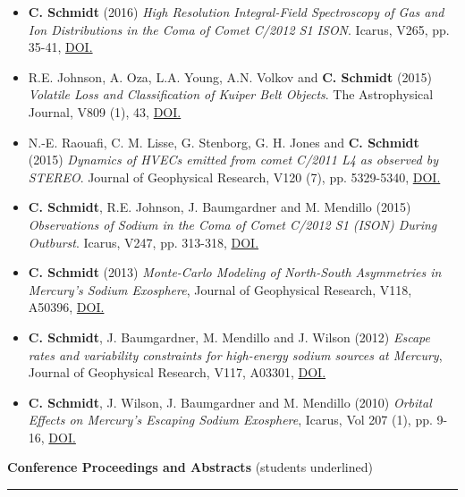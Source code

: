 \documentclass[12pt]{report}
\begin{document}
\begin{itemize}
  \item \textbf{C. Schmidt} (2016) \textit{High Resolution Integral-Field Spectroscopy of Gas and Ion Distributions in the Coma of Comet C/2012 S1 ISON}. Icarus, V265, pp. 35-41, \href{https://doi.org/10.1016/j.icarus.2015.10.009}{DOI.}
  \item R.E. Johnson, A. Oza, L.A. Young, A.N. Volkov and \textbf{C. Schmidt} (2015) \textit{Volatile Loss and Classification of Kuiper Belt Objects}. The Astrophysical Journal, V809 (1), 43, \href{https://doi.org/10.1088/0004-637X/809/1/43}{DOI.}
  \item N.-E. Raouafi, C. M. Lisse, G. Stenborg, G. H. Jones and \textbf{C. Schmidt} (2015) \textit{Dynamics of HVECs emitted from comet C/2011 L4 as observed by STEREO}. Journal of Geophysical Research, V120 (7), pp. 5329-5340, \href{https://doi.org/10.1002/2014JA020926}{DOI.}
  \item \textbf{C. Schmidt}, R.E. Johnson, J. Baumgardner and M. Mendillo (2015) \textit{Observations of Sodium in the Coma of Comet C/2012 S1 (ISON) During Outburst}. Icarus, V247, pp. 313-318, \href{https://doi.org/10.1016/j.icarus.2014.10.022}{DOI.}
  \item \textbf{C. Schmidt} (2013) \textit{Monte-Carlo Modeling of North-South Asymmetries in Mercury's Sodium Exosphere}, Journal of Geophysical Research, V118, A50396, \href{https://doi.org/10.1002/jgra.50396}{DOI.}
  \item \textbf{C. Schmidt}, J. Baumgardner, M. Mendillo and J. Wilson (2012) \textit{Escape rates and variability constraints for high-energy sodium sources at Mercury}, Journal of Geophysical Research, V117, A03301, \href{https://doi.org/10.1029/2011JA017217}{DOI.}
  \item \textbf{C. Schmidt}, J. Wilson, J. Baumgardner and M. Mendillo (2010) \textit{Orbital Effects on Mercury's Escaping Sodium Exosphere}, Icarus, Vol 207 (1), pp. 9-16, \href{https://doi.org/10.1016/j.icarus.2009.10.017}{DOI.}
 \end{itemize}
\vspace{2 mm}
\noindent\textbf{Conference Proceedings and Abstracts} (students underlined) \rm\hspace*{\fill} \\
\rule{\textwidth}{1pt}
\end{document}
